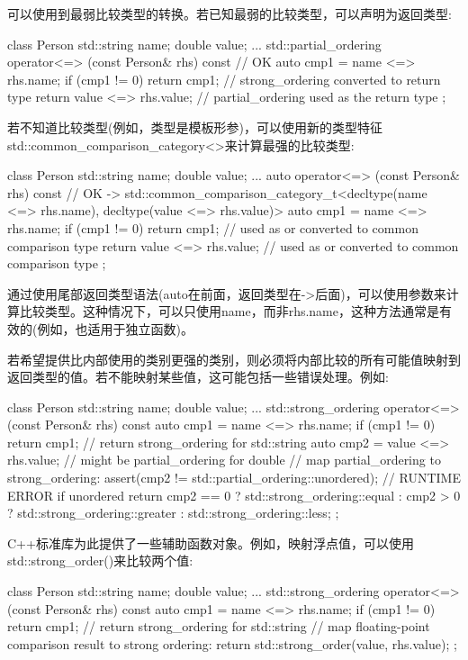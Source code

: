 可以使用到最弱比较类型的转换。若已知最弱的比较类型，可以声明为返回类型:

\begin{cpp}
class Person {
	std::string name;
	double value;
	...
	std::partial_ordering operator<=> (const Person& rhs) const { // OK
		auto cmp1 = name <=> rhs.name;
		if (cmp1 != 0) return cmp1; // strong_ordering converted to return type
		return value <=> rhs.value; // partial_ordering used as the return type
	}
};
\end{cpp}

若不知道比较类型(例如，类型是模板形参)，可以使用新的类型特征std::common\_comparison\_category<>来计算最强的比较类型:

\begin{cpp}
class Person {
	std::string name;
	double value;
	...
	auto operator<=> (const Person& rhs) const // OK
	-> std::common_comparison_category_t<decltype(name <=> rhs.name),
										 decltype(value <=> rhs.value)> {
		auto cmp1 = name <=> rhs.name;
		if (cmp1 != 0) return cmp1; // used as or converted to common comparison type
		return value <=> rhs.value; // used as or converted to common comparison type
	}
};
\end{cpp}

通过使用尾部返回类型语法(auto在前面，返回类型在->后面)，可以使用参数来计算比较类型。这种情况下，可以只使用name，而非rhs.name，这种方法通常是有效的(例如，也适用于独立函数)。

若希望提供比内部使用的类别更强的类别，则必须将内部比较的所有可能值映射到返回类型的值。若不能映射某些值，这可能包括一些错误处理。例如:

\begin{cpp}
class Person {
	std::string name;
	double value;
	...
	std::strong_ordering operator<=> (const Person& rhs) const {
		auto cmp1 = name <=> rhs.name;
		if (cmp1 != 0) return cmp1; // return strong_ordering for std::string
		auto cmp2 = value <=> rhs.value; // might be partial_ordering for double
		// map partial_ordering to strong_ordering:
		assert(cmp2 != std::partial_ordering::unordered); // RUNTIME ERROR if unordered
		return cmp2 == 0 ? std::strong_ordering::equal
		                 : cmp2 > 0 ? std::strong_ordering::greater
		                            : std::strong_ordering::less;
	}
};
\end{cpp}

C++标准库为此提供了一些辅助函数对象。例如，映射浮点值，可以使用std::strong\_order()来比较两个值:

\begin{cpp}
class Person {
	std::string name;
	double value;
	...
	std::strong_ordering operator<=> (const Person& rhs) const {
		auto cmp1 = name <=> rhs.name;
		if (cmp1 != 0) return cmp1; // return strong_ordering for std::string
		// map floating-point comparison result to strong ordering:
		return std::strong_order(value, rhs.value);
	}
};
\end{cpp}

